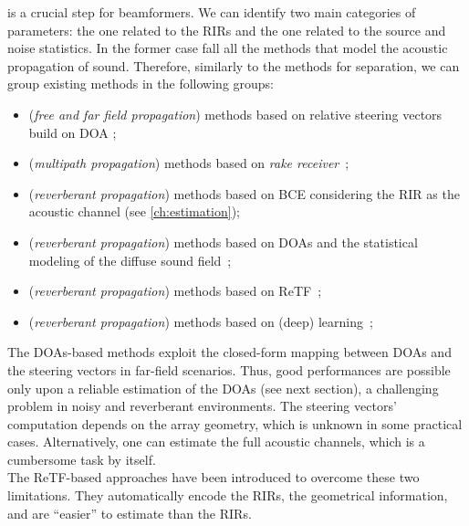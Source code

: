  is a crucial step for beamformers.
We can identify two main categories of parameters: the one related to the \acp{RIR} and the one related to the source and noise statistics.
In the former case fall all the methods that model the acoustic propagation of sound.
Therefore, similarly to the methods for separation, we can group existing methods in the following groups:
\begin{itemize}
    \item (\textit{free and far field propagation}) methods based on relative steering vectors build on \ac{DOA} ;
    \item (\textit{multipath propagation}) methods based on \textit{rake receiver}~;
    \item (\textit{reverberant propagation}) methods based on \ac{BCE} considering the \ac{RIR} as the acoustic channel (see \cref{ch:estimation});
    \item (\textit{reverberant propagation}) methods based on \acp{DOA} and the statistical modeling of the diffuse sound field~;
    \item (\textit{reverberant propagation}) methods based on \ac{ReTF}~;
    \item (\textit{reverberant propagation}) methods based on (deep) learning~;
\end{itemize}
The \acp{DOA}-based methods exploit the closed-form mapping between \acp{DOA} and the steering vectors in far-field scenarios.
Thus, good performances are possible only upon a reliable estimation of the \acp{DOA} (see next section), a challenging problem in noisy and reverberant environments.
The steering vectors' computation depends on the array geometry, which is unknown in some practical cases.
Alternatively, one can estimate the full acoustic channels, which is a cumbersome task by itself.
\\The \ac{ReTF}-based approaches have been introduced to overcome these two limitations.
They automatically encode the \acp{RIR}, the geometrical information, and are ``easier'' to estimate than the \acp{RIR}.
